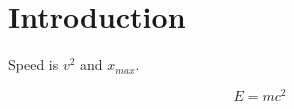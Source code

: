 \documentclass[11pt]{article}
\begin{document}
\section{Introduction}\label{sec:intro}

Speed is $v^{2}$ and $x_{max}$.

\begin{equation}\label{eq:energy}
	E = mc^2
\end{equation}



\printbibliography
\end{document}
